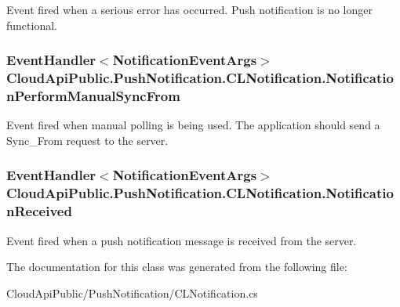Event fired when a serious error has occurred. Push notification is no longer functional. 

\hypertarget{class_cloud_api_public_1_1_push_notification_1_1_c_l_notification_ac2922d1d48868bd4b3562f3e92d450f7}{
\subsubsection[{Notification\-Perform\-Manual\-Sync\-From}]{\setlength{\rightskip}{0pt plus 5cm}Event\-Handler$<${\bf Notification\-Event\-Args}$>$ Cloud\-Api\-Public.\-Push\-Notification.\-C\-L\-Notification.\-Notification\-Perform\-Manual\-Sync\-From}}\label{class_cloud_api_public_1_1_push_notification_1_1_c_l_notification_ac2922d1d48868bd4b3562f3e92d450f7}


Event fired when manual polling is being used. The application should send a Sync\-\_\-\-From request to the server. 

\hypertarget{class_cloud_api_public_1_1_push_notification_1_1_c_l_notification_a5bafbe473f43db150e6280ca3f2b9f12}{
\subsubsection[{Notification\-Received}]{\setlength{\rightskip}{0pt plus 5cm}Event\-Handler$<${\bf Notification\-Event\-Args}$>$ Cloud\-Api\-Public.\-Push\-Notification.\-C\-L\-Notification.\-Notification\-Received}}\label{class_cloud_api_public_1_1_push_notification_1_1_c_l_notification_a5bafbe473f43db150e6280ca3f2b9f12}


Event fired when a push notification message is received from the server. 



The documentation for this class was generated from the following file\-:\begin{DoxyCompactItemize}
\item 
Cloud\-Api\-Public/\-Push\-Notification/C\-L\-Notification.\-cs\end{DoxyCompactItemize}
